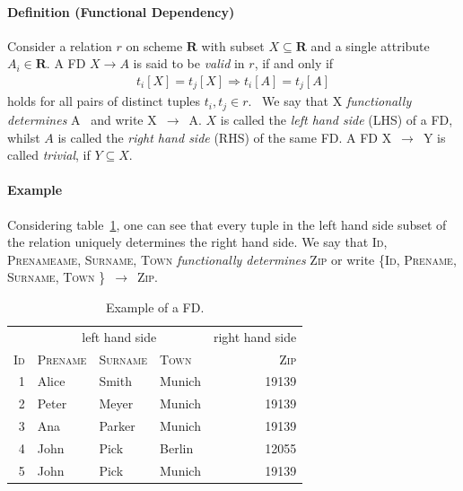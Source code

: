 \paragraph{Definition (Functional Dependency)}
Consider a relation \(r\) on scheme \(\boldsymbol{R}\) with subset \(X \subseteq \boldsymbol{R}\) and a single attribute \(A_i \in \boldsymbol{R}\).
A FD \(X \to A\) is said to be \emph{valid} in \(r\), if and only if
\begin{align}
    t_i[X] = t_j[X] \Rightarrow t_i[A] = t_j[A] \label{eq:fd-condition}
\end{align}
holds for all pairs of distinct tuples \(t_i,t_j \in r\).~\cite[p.~21]{ABE19}
We say that \textsc{X} \emph{functionally determines} \textsc{A}~\cite[p.~43]{MAI83} and write \textsc{X}~\( \rightarrow \)~\textsc{A}.
\(X\) is called the \emph{left hand side} (LHS) of a FD, whilst \(A\) is called the \emph{right hand side} (RHS) of the same FD.
A FD \textsc{X}~\( \rightarrow \)~\textsc{Y} is called \emph{trivial}, if \( Y \subseteq X \).\cite[p.~163]{STU16}

\paragraph{Example} Considering table~\ref{tab:fd-example}, one can see that every tuple in the left hand side subset of the relation uniquely determines the right hand side.
We say that \textsc{Id}, \textsc{Prenameame}, \textsc{Surname}, \textsc{Town} \emph{functionally determines} \textsc{Zip} or write \{\textsc{Id}, \textsc{Prename}, \textsc{Surname}, \textsc{Town} \}~\( \rightarrow \)~\textsc{Zip}.~\cite[p.~43]{MAI83}

\begin{table}[ht]
    \centering
    \begin{tabular}{rlllr}
        \toprule
        \toprule
        & \multicolumn{3}{c}{left hand side} & \multicolumn{1}{c}{right hand side} \\ \cmidrule(lr{.25em}){1-4} \cmidrule(l{4.75em}){4-5}
        \textsc{Id} & \textsc{Prename} & \textsc{Surname} & \textsc{Town} & \textsc{Zip} \\
        \midrule
        1 & Alice & Smith & Munich & 19139 \\
        2 & Peter& Meyer & Munich & 19139 \\
        3 & Ana & Parker & Munich & 19139  \\
        4 & John & Pick & Berlin & 12055 \\
        5 & John & Pick & Munich & 19139 \\
        \bottomrule
        \bottomrule
    \end{tabular}
    \caption{Example of a FD.}\label{tab:fd-example}
\end{table}

